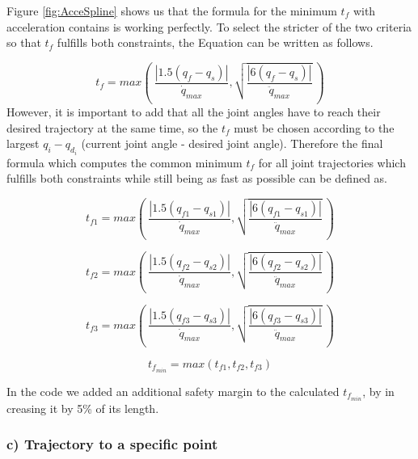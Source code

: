 Figure \ref{fig:AcceSpline} shows us that the formula for the minimum $t_f$ with acceleration contains is working perfectly. To select the stricter of the two criteria so that $t_f$ fulfills both constraints, the Equation can be written as follows.

\begin{equation}
    t_f=max(\ \frac{|1.5(q_f-q_s)|}{\dot{q}_{max}}, \sqrt{\frac{|6(q_{f}-q_{s})|}{\ddot{q}_{max}}}\ ) 
\end{equation}
\newpage
However, it is important to add that all the joint angles have to reach their desired trajectory at the same time, so the $t_f$ must be chosen according to the largest $q_i - q_{d_i}$ (current joint angle - desired joint angle). Therefore the final formula which computes the common minimum $t_f$ for all joint trajectories which fulfills both constraints while still being as fast as possible can be defined as.

\begin{equation}
    t_{f1}=max(\ \frac{|1.5(q_{f1}-q_{s1})|}{\dot{q}_{max}}, \sqrt{\frac{|6(q_{f1}-q_{s1})|}{\ddot{q}_{max}}}\ ) 
\end{equation}

\begin{equation}
    t_{f2}=max(\ \frac{|1.5(q_{f2}-q_{s2})|}{\dot{q}_{max}}, \sqrt{\frac{|6(q_{f2}-q_{s2})|}{\ddot{q}_{max}}}\ )
\end{equation}

\begin{equation}
    t_{f3}=max(\ \frac{|1.5(q_{f3}-q_{s3})|}{\dot{q}_{max}}, \sqrt{\frac{|6(q_{f3}-q_{s3})|}{\ddot{q}_{max}}}\ )
    \label{eq:q3tfmin}
\end{equation}

\begin{equation}
    t_f_{min}=max(t_{f1},t_{f2},t_{f3})
\end{equation}


In the code we added an additional safety margin to the calculated $t_f_{min}$, by in creasing it by 5\% of its length.

\subsubsection{c) Trajectory to a specific point}

